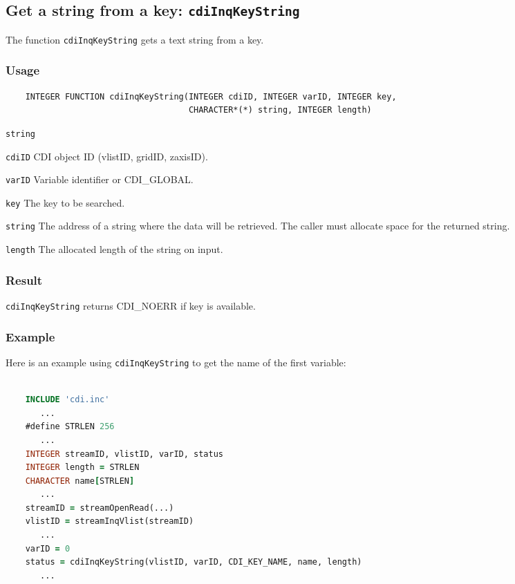 \subsection{Get a string from a key: \texttt{cdiInqKeyString}}
\label{cdiInqKeyString}

The function {\texttt{cdiInqKeyString}} gets a text string from a key.

\subsubsection*{Usage}

\begin{verbatim}
    INTEGER FUNCTION cdiInqKeyString(INTEGER cdiID, INTEGER varID, INTEGER key, 
                                     CHARACTER*(*) string, INTEGER length)
\end{verbatim}

\hspace*{4mm}\begin{minipage}[]{15cm}
\begin{deflist}{\texttt{string}\ }
\item[\texttt{cdiID}]
CDI object ID (vlistID, gridID, zaxisID).
\item[\texttt{varID}]
Variable identifier or CDI\_GLOBAL.
\item[\texttt{key}]
The key to be searched.
\item[\texttt{string}]
The address of a string where the data will be retrieved.
                    The caller must allocate space for the returned string.
\item[\texttt{length}]
The allocated length of the string on input.
\end{deflist}
\end{minipage}

\subsubsection*{Result}

{\texttt{cdiInqKeyString}} returns CDI\_NOERR if key is available.


\subsubsection*{Example}

Here is an example using {\texttt{cdiInqKeyString}} to get the name of the first variable:

\begin{lstlisting}[language=Fortran, backgroundcolor=\color{pyellow}, basicstyle=\small, columns=flexible]

    INCLUDE 'cdi.inc'
       ...
    #define STRLEN 256
       ...
    INTEGER streamID, vlistID, varID, status
    INTEGER length = STRLEN
    CHARACTER name[STRLEN]
       ...
    streamID = streamOpenRead(...)
    vlistID = streamInqVlist(streamID)
       ...
    varID = 0
    status = cdiInqKeyString(vlistID, varID, CDI_KEY_NAME, name, length)
       ...
\end{lstlisting}


